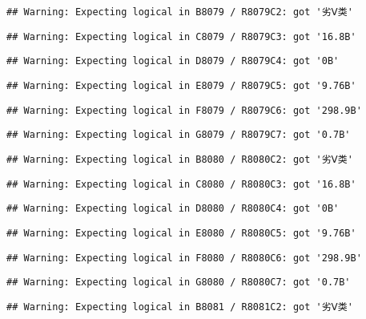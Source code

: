 \documentclass[
]{article}
\begin{document}
\begin{verbatim}
## Warning: Expecting logical in B8079 / R8079C2: got '劣Ⅴ类'
\end{verbatim}

\begin{verbatim}
## Warning: Expecting logical in C8079 / R8079C3: got '16.8B'
\end{verbatim}

\begin{verbatim}
## Warning: Expecting logical in D8079 / R8079C4: got '0B'
\end{verbatim}

\begin{verbatim}
## Warning: Expecting logical in E8079 / R8079C5: got '9.76B'
\end{verbatim}

\begin{verbatim}
## Warning: Expecting logical in F8079 / R8079C6: got '298.9B'
\end{verbatim}

\begin{verbatim}
## Warning: Expecting logical in G8079 / R8079C7: got '0.7B'
\end{verbatim}

\begin{verbatim}
## Warning: Expecting logical in B8080 / R8080C2: got '劣Ⅴ类'
\end{verbatim}

\begin{verbatim}
## Warning: Expecting logical in C8080 / R8080C3: got '16.8B'
\end{verbatim}

\begin{verbatim}
## Warning: Expecting logical in D8080 / R8080C4: got '0B'
\end{verbatim}

\begin{verbatim}
## Warning: Expecting logical in E8080 / R8080C5: got '9.76B'
\end{verbatim}

\begin{verbatim}
## Warning: Expecting logical in F8080 / R8080C6: got '298.9B'
\end{verbatim}

\begin{verbatim}
## Warning: Expecting logical in G8080 / R8080C7: got '0.7B'
\end{verbatim}

\begin{verbatim}
## Warning: Expecting logical in B8081 / R8081C2: got '劣Ⅴ类'
\end{verbatim}
\end{document}
